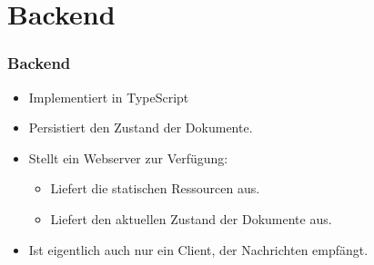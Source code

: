 \section{Backend}
\begin{frame}
    \frametitle{Backend}
    \begin{itemize}
        \item Implementiert in TypeScript
        \item Persistiert den Zustand der Dokumente.
        \item Stellt ein Webserver zur Verfügung:
        \begin{itemize}
            \item Liefert die statischen Ressourcen aus.
            \item Liefert den aktuellen Zustand der Dokumente aus.
        \end{itemize}
        \item Ist eigentlich auch nur ein Client, der Nachrichten empfängt.
    \end{itemize}
\end{frame}
